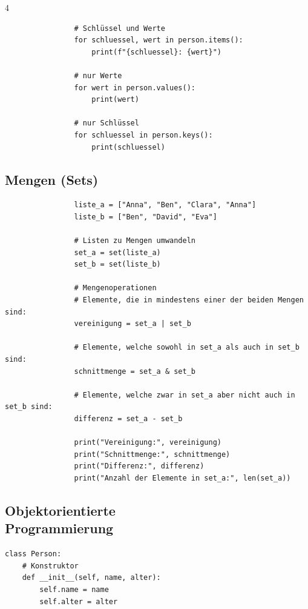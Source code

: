\begin{landscape}
\begin{multicols*}{4}
\begin{cheatSheetBox}[title=Dictionary durchlaufen]
\begin{lstlisting}
				# Schlüssel und Werte
				for schluessel, wert in person.items():
					print(f"{schluessel}: {wert}")

				# nur Werte
				for wert in person.values():
					print(wert)

				# nur Schlüssel
				for schluessel in person.keys():
					print(schluessel)
			\end{lstlisting}
		\end{cheatSheetBox}

		\columnbreak\textcolor{\cheatSheetColor}{\subsection*{Mengen (Sets)}}
		\begin{cheatSheetBox}[title=Mengen (Sets)]
			\begin{lstlisting}
				liste_a = ["Anna", "Ben", "Clara", "Anna"]
				liste_b = ["Ben", "David", "Eva"]

				# Listen zu Mengen umwandeln
				set_a = set(liste_a)
				set_b = set(liste_b)

				# Mengenoperationen
				# Elemente, die in mindestens einer der beiden Mengen sind:
				vereinigung = set_a | set_b

				# Elemente, welche sowohl in set_a als auch in set_b sind:
				schnittmenge = set_a & set_b

				# Elemente, welche zwar in set_a aber nicht auch in set_b sind:
				differenz = set_a - set_b

				print("Vereinigung:", vereinigung)
				print("Schnittmenge:", schnittmenge)
				print("Differenz:", differenz)
				print("Anzahl der Elemente in set_a:", len(set_a))
			\end{lstlisting}
		\end{cheatSheetBox}

		\columnbreak\textcolor{\cheatSheetColor}{\subsection*{Objektorientierte\\ Programmierung}}

		\begin{cheatSheetBox}[title=Klassen definieren]
			\begin{lstlisting}
class Person:
    # Konstruktor
    def __init__(self, name, alter):
        self.name = name
        self.alter = alter


\end{lstlisting}
\end{cheatSheetBox}
\end{multicols*}
\end{landscape}
